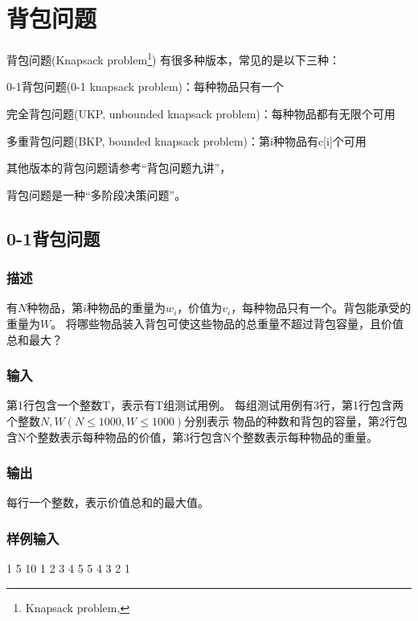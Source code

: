 \section{背包问题} %
背包问题(Knapsack problem\footnote{Knapsack problem, })
有很多种版本，常见的是以下三种：
\begindot
\item 0-1背包问题(0-1 knapsack problem)：每种物品只有一个
\item 完全背包问题(UKP, unbounded knapsack problem)：每种物品都有无限个可用
\item 多重背包问题(BKP, bounded knapsack problem)：第i种物品有c[i]个可用
\myenddot

其他版本的背包问题请参考“背包问题九讲”，

背包问题是一种“多阶段决策问题”。

\subsection{0-1背包问题}

\subsubsection{描述}
有$N$种物品，第$i$种物品的重量为$w_i$，价值为$v_i$，每种物品只有一个。背包能承受的重量为$W$。
将哪些物品装入背包可使这些物品的总重量不超过背包容量，且价值总和最大？

\subsubsection{输入}
第1行包含一个整数T，表示有T组测试用例。
每组测试用例有3行，第1行包含两个整数$N, W(N \leq 1000 , W \leq 1000)$分别表示
物品的种数和背包的容量，第2行包含N个整数表示每种物品的价值，第3行包含N个整数表示每种物品的重量。

\subsubsection{输出}
每行一个整数，表示价值总和的最大值。

\subsubsection{样例输入}
\begin{Code}
1
5 10
1 2 3 4 5
5 4 3 2 1
\end{Code}

